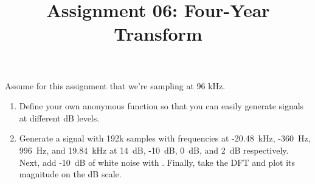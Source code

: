 \documentclass{article}
\title{Assignment 06: Four-Year Transform}
\begin{document}
\renderTitle

Assume for this assignment that we're sampling at 96 kHz.

\begin{enumerate}[leftmargin=*]
	\item
		Define your own anonymous  function
		so that you can easily generate signals at different dB
		levels.

	\item
		Generate a signal with 192k samples with frequencies at
		-20.48~kHz, -360~Hz, 996~Hz, and 19.84~kHz at 14~dB,
		-10~dB, 0~dB, and 2~dB respectively.  Next, add -10~dB
		of white noise with .  Finally, take
		the DFT and plot its magnitude on the dB scale.
\end{enumerate}
\end{document}
